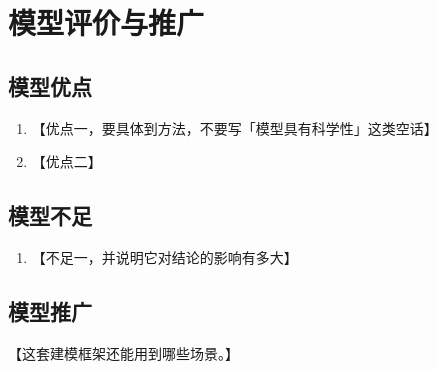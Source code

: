 \section{模型评价与推广}

\subsection{模型优点}

\begin{enumerate}
  \item 【优点一，要具体到方法，不要写「模型具有科学性」这类空话】
  \item 【优点二】
\end{enumerate}

\subsection{模型不足}

\begin{enumerate}
  \item 【不足一，并说明它对结论的影响有多大】
\end{enumerate}

\subsection{模型推广}

【这套建模框架还能用到哪些场景。】
